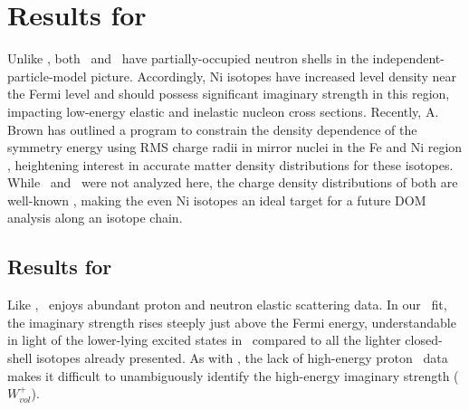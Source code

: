 \section{Results for \niEightFour}
Unlike \caAughtEight, both \niEight\ and \niFour\ have partially-occupied neutron shells in the
independent-particle-model picture. Accordingly, Ni isotopes have increased level density near the
Fermi level and should possess significant imaginary strength in this region, impacting
low-energy elastic and inelastic nucleon cross sections. Recently, A. Brown has outlined a
program to constrain the density dependence of the symmetry energy using RMS charge radii in mirror
nuclei in the Fe and Ni region \cite{Brown2017}, heightening interest in accurate
matter density distributions for these isotopes. While \niSixty\ and \niTwo\
were not analyzed here, the charge density distributions of
both are well-known \cite{DeVries1987}, making the even Ni isotopes an ideal target for a future
DOM analysis along an isotope chain.

\subsection{Results for \niEight}
Like \caForty, \niEight\ enjoys abundant proton and neutron elastic scattering data.
In our \niEight\ fit, the imaginary strength rises steeply just above the Fermi energy,
understandable in light of the lower-lying excited states in \niEight\ compared to all the lighter
closed-shell isotopes already presented. As with \caEight, the lack of high-energy proton \rxn\ data
makes it difficult to unambiguously identify the high-energy imaginary strength ($W_{vol}^{+}$).

